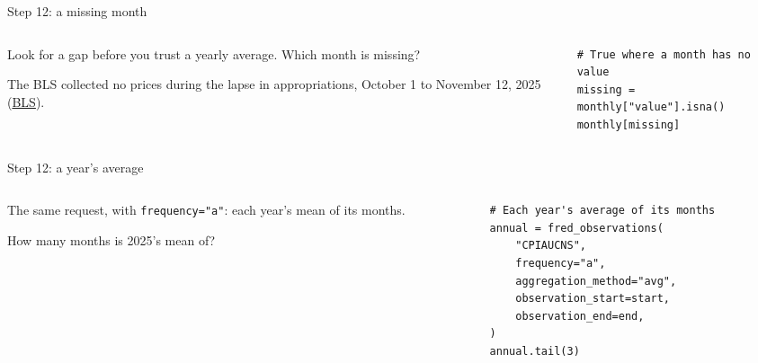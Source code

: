 \documentclass[9pt,aspectratio=169]{beamer}
\begin{document}
\begin{frame}[fragile]{Step 12: a missing month}
    \begin{columns}[T]
        \begin{column}{0.37\textwidth}
            Look for a gap before you trust a yearly average. Which month is missing?

            \medskip
            {\footnotesize The BLS collected no prices during the lapse in appropriations, October 1 to November 12, 2025 (\href{https://www.bls.gov/cpi/additional-resources/2025-federal-government-shutdown-impact-cpi-faq.htm}{BLS}).\par}
        \end{column}
        \begin{column}{0.6\textwidth}
\begin{lstlisting}
# True where a month has no value
missing = monthly["value"].isna()
monthly[missing]
\end{lstlisting}
        \end{column}
    \end{columns}
\end{frame}

\begin{frame}[fragile]{Step 12: a year's average}
    \begin{columns}[T]
        \begin{column}{0.37\textwidth}
            The same request, with \texttt{frequency="a"}: each year's mean of its months.

            \medskip
            How many months is 2025's mean of?
        \end{column}
        \begin{column}{0.6\textwidth}
\begin{lstlisting}
# Each year's average of its months
annual = fred_observations(
    "CPIAUCNS",
    frequency="a",
    aggregation_method="avg",
    observation_start=start,
    observation_end=end,
)
annual.tail(3)
\end{lstlisting}
        \end{column}
    \end{columns}
\end{frame}
\end{document}
